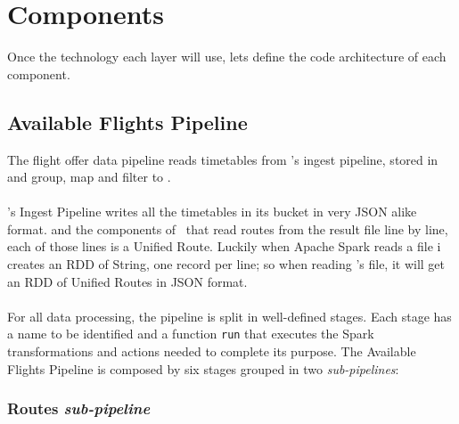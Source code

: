 



\section{Components}

Once the technology each layer will use, lets define the code architecture of each component.


\subsection{Available Flights Pipeline} \label{available-flights-pipeline}

The flight offer data pipeline reads timetables from \squad's ingest pipeline, stored in  and group, map and filter to .
\\\\
\squad's Ingest Pipeline writes all the timetables in its  bucket in very JSON\cite{json} alike format.  and the components of \squad\ that read routes from the result file line by line, each of those lines is a Unified Route. Luckily when Apache Spark reads a file i creates an RDD of String, one record per line; so when reading \squad's file, it will get an RDD of Unified Routes in JSON\cite{json} format.
\\\\
For all data processing, the pipeline is split in well-defined stages. Each stage has a name to be identified and a function \texttt{run} that executes the Spark transformations and actions needed to complete its purpose. The Available Flights Pipeline is composed by six stages grouped in two \textit{sub-pipelines}:

\subsubsection*{Routes \textit{sub-pipeline}}

